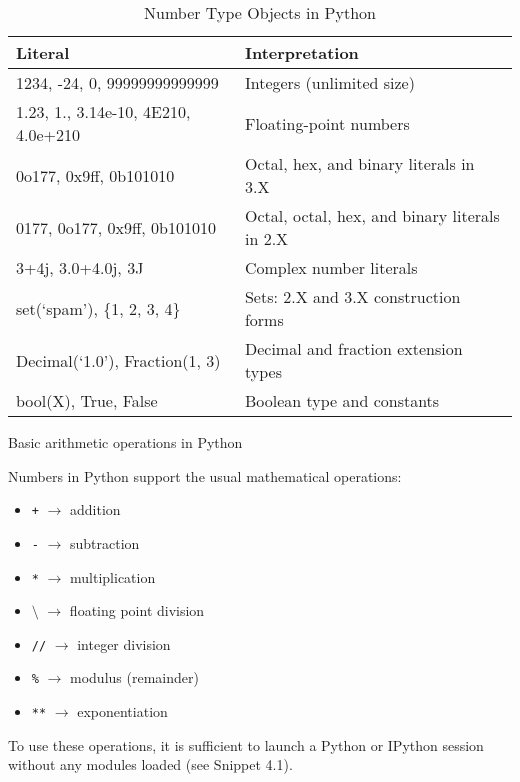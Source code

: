 \documentclass[a4paper,11pt]{book}
\numberwithin{figure}{chapter}
\numberwithin{table}{chapter}
\newcommand{\question}[1]{%
    \begin{tcolorbox}[colback=comp_c!10,colframe=comp_c,sidebyside align=top,width=\linewidth,before skip=1ex]
        #1
    \end{tcolorbox}
    \switchcolumn%
}
\newcommand{\note}[1]{%
    \begin{tcolorbox}[colback=white!0,colframe=white!10,width=\linewidth,before skip=1ex]
        #1
    \end{tcolorbox}
}
\begin{document}
\begin{table}[!htbp]
	\centering
	\caption{Number Type Objects in Python}
	\label{tab:number_types_in_python}
	\begin{tabular}{ll}
		\toprule \toprule
		Literal & Interpretation\\
		\midrule
		 1234, -24, 0, 99999999999999 & Integers (unlimited size)\\
		 1.23, 1., 3.14e-10, 4E210, 4.0e+210 & Floating-point numbers \\
		 0o177, 0x9ff, 0b101010 & Octal, hex, and binary literals in 3.X \\
		 0177, 0o177, 0x9ff, 0b101010 & Octal, octal, hex, and binary literals in 2.X \\
		 3+4j, 3.0+4.0j, 3J & Complex number literals \\
		 set(`spam'), \{1, 2, 3, 4\} & Sets: 2.X and 3.X construction forms\\ Decimal(`1.0'), Fraction(1, 3) & Decimal and fraction extension types\\
		 bool(X), True, False & Boolean type and constants\\
		 \bottomrule
	\end{tabular}
\end{table}

\begin{paracol}{2}
	\question{\raggedright Basic arithmetic operations in Python}
	\note{Numbers in Python support the usual mathematical operations:
		\begin{itemize}
			\item \texttt{+} $\rightarrow$ addition
			\item \texttt{-} $\rightarrow$ subtraction
			\item \texttt{*} $\rightarrow$ multiplication
			\item \texttt{$\setminus$} $\rightarrow$ floating point division
			\item \texttt{//} $\rightarrow$ integer division
			\item \texttt{\%} $\rightarrow$ modulus (remainder)
			\item \texttt{**} $\rightarrow$ exponentiation
		\end{itemize}
		 To use these operations, it is sufficient to launch a  Python or IPython session without any modules loaded (see Snippet 4.1).}
\end{paracol}
\end{document}
